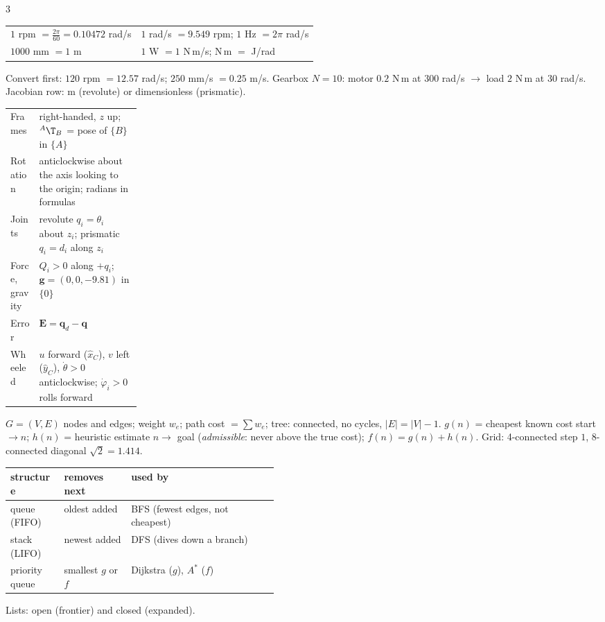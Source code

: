 \begin{multicols}{3}
\begin{fbx}
\begin{tabularx}{\linewidth}{@{}XX@{}}
$1$ rpm $=\frac{2\pi}{60}=0.10472$ rad/s & $1$ rad/s $=9.549$ rpm; $1$ Hz $=2\pi$ rad/s\\
$1000$ mm $=1$ m & $1$ W $=1$ N\,m/s; N\,m $=$ J/rad\\
\end{tabularx}
Convert first: $120$ rpm $=12.57$ rad/s; $250$ mm/s $=0.25$ m/s. Gearbox $N=10$: motor $0.2$ N\,m at $300$ rad/s $\to$ load $2$ N\,m at $30$ rad/s. Jacobian row: m (revolute) or dimensionless (prismatic). \chk\\[2pt]
\begin{tabularx}{\linewidth}{@{}>{\raggedright\arraybackslash}p{0.22\linewidth}X@{}}\toprule
Frames & right-handed, $z$ up; ${}^A\T_B$ = pose of $\{B\}$ in $\{A\}$\\
Rotation & anticlockwise about the axis looking to the origin; radians in formulas\\
Joints & revolute $q_i=\theta_i$ about $z_i$; prismatic $q_i=d_i$ along $z_i$\\
Force, gravity & $Q_i>0$ along $+q_i$; $\mathbf g=(0,0,-9.81)$ in $\{0\}$\\
Error & $\mathbf E=\mathbf q_d-\mathbf q$\\
Wheeled & $u$ forward ($\hat x_C$), $v$ left ($\hat y_C$), $\dot\theta>0$ anticlockwise; $\dot\varphi_i>0$ rolls forward\\\bottomrule
\end{tabularx}
\end{fbx}

\nopagebreak[4]
\begin{fbx}
$G=(V,E)$ nodes and edges; weight $w_e$; path cost $=\sum w_e$; tree: connected, no cycles, $|E|=|V|-1$. $g(n)$ = cheapest known cost start$\to n$; $h(n)$ = heuristic estimate $n\to$ goal (\emph{admissible}: never above the true cost); $f(n)=g(n)+h(n)$. Grid: 4-connected step $1$, 8-connected diagonal $\sqrt2=1.414$.
\begin{tabularx}{\linewidth}{@{}>{\raggedright\arraybackslash}p{0.2\linewidth}>{\raggedright\arraybackslash}p{0.25\linewidth}X@{}}\toprule
structure & removes next & used by\\\midrule
queue (FIFO) & oldest added & BFS (fewest edges, not cheapest)\\
stack (LIFO) & newest added & DFS (dives down a branch)\\
priority queue & smallest $g$ or $f$ & Dijkstra ($g$), $A^*$ ($f$)\\\bottomrule
\end{tabularx}
Lists: open (frontier) and closed (expanded).
\end{fbx}


\end{multicols}
